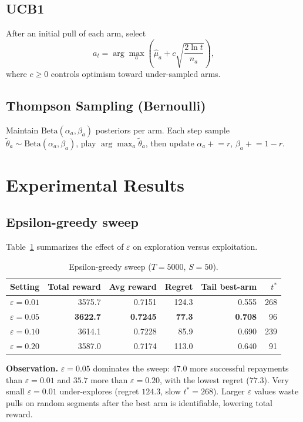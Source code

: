 \documentclass[11pt,a4paper]{article}
\begin{document}
\subsection{UCB1}

After an initial pull of each arm, select
\[
a_t = \arg\max_a \left( \hat{\mu}_a + c \sqrt{\frac{2 \ln t}{n_a}} \right),
\]
where $c \geq 0$ controls optimism toward under-sampled arms.

\subsection{Thompson Sampling (Bernoulli)}

Maintain $\mathrm{Beta}(\alpha_a, \beta_a)$ posteriors per arm. Each step sample $\tilde{\theta}_a \sim \mathrm{Beta}(\alpha_a,\beta_a)$, play $\arg\max_a \tilde{\theta}_a$, then update $\alpha_a \mathrel{+}= r$, $\beta_a \mathrel{+}= 1-r$.

\section{Experimental Results}

\subsection{Epsilon-greedy sweep}

Table~\ref{tab:epsilon} summarizes the effect of $\varepsilon$ on exploration versus exploitation.

\begin{table}[htbp]
  \centering
  \caption{Epsilon-greedy sweep ($T{=}5000$, $S{=}50$).}
  \label{tab:epsilon}
  \begin{tabular}{lrrrrr}
    \toprule
    Setting & Total reward & Avg reward & Regret & Tail best-arm & $t^\ast$ \\
    \midrule
    $\varepsilon = 0.01$ & 3575.7 & 0.7151 & 124.3 & 0.555 & 268 \\
    $\varepsilon = 0.05$ & \textbf{3622.7} & \textbf{0.7245} & \textbf{77.3} & \textbf{0.708} & 96 \\
    $\varepsilon = 0.10$ & 3614.1 & 0.7228 & 85.9 & 0.690 & 239 \\
    $\varepsilon = 0.20$ & 3587.0 & 0.7174 & 113.0 & 0.640 & 91 \\
    \bottomrule
  \end{tabular}
\end{table}

\textbf{Observation.} $\varepsilon{=}0.05$ dominates the sweep: $47.0$ more successful repayments than $\varepsilon{=}0.01$ and $35.7$ more than $\varepsilon{=}0.20$, with the lowest regret ($77.3$). Very small $\varepsilon{=}0.01$ under-explores (regret $124.3$, slow $t^\ast{=}268$). Larger $\varepsilon$ values waste pulls on random segments after the best arm is identifiable, lowering total reward.
\end{document}
